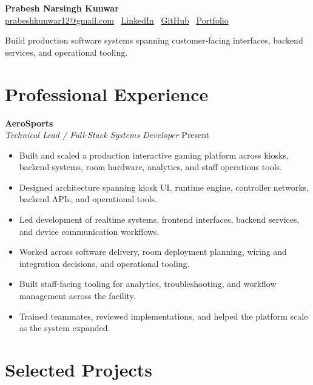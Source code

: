 \documentclass[a4paper,10pt]{article}
\newcommand{\tightvspace}{\vspace{2pt}}
\begin{document}
\begin{center}
    {\LARGE \textbf{Prabesh Narsingh Kunwar}} \\
    \tightvspace\href{mailto:prabeshkunwar12@gmail.com}{prabeshkunwar12@gmail.com} \textbar\ \href{https://www.linkedin.com/in/prabesh-kunwar/}{LinkedIn} \textbar\ \href{https://github.com/prabeshkunwar12}{GitHub} \textbar\ \href{https://prabeshkunwar12.github.io/portfolio/}{Portfolio}\end{center}

\noindent Build production software systems spanning customer-facing interfaces, backend services, and operational tooling.

\section*{Professional Experience}

\textbf{AeroSports} \\
\textit{Technical Lead / Full-Stack Systems Developer} \hfill Present
\begin{itemize}
    \item Built and scaled a production interactive gaming platform across kiosks, backend systems, room hardware, analytics, and staff operations tools.
    \item Designed architecture spanning kiosk UI, runtime engine, controller networks, backend APIs, and operational tools.
    \item Led development of realtime systems, frontend interfaces, backend services, and device communication workflows.
    \item Worked across software delivery, room deployment planning, wiring and integration decisions, and operational tooling.
    \item Built staff-facing tooling for analytics, troubleshooting, and workflow management across the facility.
    \item Trained teammates, reviewed implementations, and helped the platform scale as the system expanded.
\end{itemize}

\section*{Selected Projects}
\end{document}
